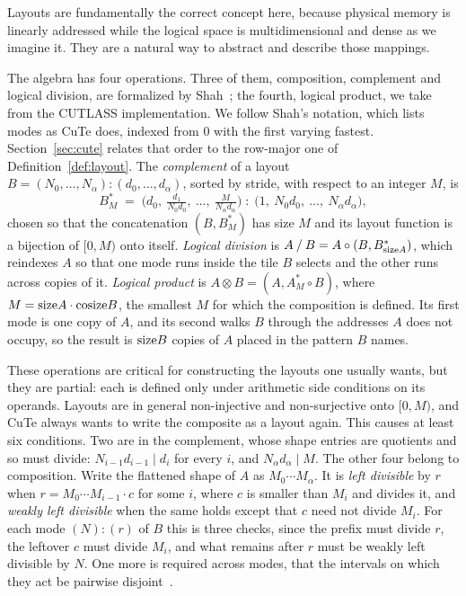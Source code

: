 Layouts are fundamentally the correct concept here, because physical memory is
linearly addressed while the logical space is multidimensional and dense as we
imagine it. They are a natural way to abstract and describe those mappings.

The algebra has four operations. Three of them, composition, complement and
logical division, are formalized by Shah~\cite{shah}; the fourth, logical
product, we take from the CUTLASS implementation. We follow
Shah's notation, which lists modes as CuTe does, indexed from $0$ with the
first varying fastest. Section~\ref{sec:cute} relates that order to the
row-major one of Definition~\ref{def:layout}. The \emph{complement} of a
layout
$B = (N_0,\dots,N_\alpha){:}(d_0,\dots,d_\alpha)$, sorted by stride, with
respect to an integer $M$, is
\[
B^{*}_{M} \;=\;
\Big(d_0,\ \tfrac{d_1}{N_0 d_0},\ \dots,\ \tfrac{M}{N_\alpha d_\alpha}\Big)
\;{:}\;
\Big(1,\ N_0 d_0,\ \dots,\ N_\alpha d_\alpha\Big),
\]
chosen so that the concatenation $(B, B^{*}_{M})$ has size $M$ and its layout
function is a bijection of $[0,M)$ onto itself. \emph{Logical division} is
$A \mathbin{/} B = A \circ (B, B^{*}_{\mathrm{size} A})$, which reindexes $A$ so that
one mode runs inside the tile $B$ selects and the other runs across copies of
it. \emph{Logical product} is $A \otimes B = (A, A^{*}_{M} \circ B)$, where
$M = \mathrm{size} A \cdot \mathrm{cosize} B$, the smallest $M$ for which the composition is
defined. Its
first mode is one copy of $A$, and its second walks $B$ through the addresses
$A$ does not occupy, so the result is $\mathrm{size} B$ copies of $A$ placed in the
pattern $B$ names.

These operations are critical for constructing the layouts one usually wants,
but they are partial: each is defined only under arithmetic side conditions on
its operands. Layouts are in general
non-injective and non-surjective onto $[0,M)$, and CuTe always wants to write
the composite as a layout again. This causes at least six conditions. Two are in the complement, whose
shape entries are quotients and so must divide: $N_{i-1}d_{i-1} \mid d_i$ for
every $i$, and $N_\alpha d_\alpha \mid M$. The other four belong to
composition. Write the flattened shape of $A$ as $M_0 \cdots M_\alpha$. It is \emph{left divisible} by $r$
when $r = M_0 \cdots M_{i-1} \cdot c$ for some $i$, where $c$ is smaller than
$M_i$ and divides it, and \emph{weakly left divisible} when the same holds
except that $c$ need not divide $M_i$. For each mode $(N){:}(r)$ of $B$ this is
three checks, since the prefix must divide $r$, the leftover $c$ must divide
$M_i$, and what remains after $r$ must be weakly left divisible by $N$. One
more is required across modes, that the intervals on which they act be pairwise
disjoint~\cite{shah}.

